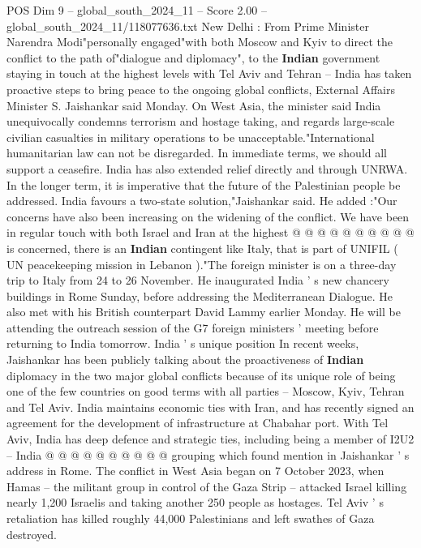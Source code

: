 \begin{textsample}{POS Dim 9 – global\_south\_2024\_11 – Score 2.00 – global\_south\_2024\_11/118077636.txt}  \label{ex:f9_pos_027}
New Delhi : From Prime Minister Narendra Modi"personally engaged"with both Moscow and Kyiv to direct the conflict to the path of"dialogue and diplomacy", to the \textbf{Indian} government staying in touch at the highest levels with Tel Aviv and Tehran -- India has taken proactive steps to bring peace to the ongoing global conflicts, External Affairs Minister S.
Jaishankar said Monday.
On West Asia, the minister said India unequivocally condemns terrorism and hostage taking, and regards large-scale civilian casualties in military operations to be unacceptable."International humanitarian law can not be disregarded.
In immediate terms, we should all support a ceasefire.
India has also extended relief directly and through UNRWA.
In the longer term, it is imperative that the future of the Palestinian people be addressed.
India favours a two-state solution,"Jaishankar said.
He added :"Our concerns have also been increasing on the widening of the conflict.
We have been in regular touch with both Israel and Iran at the highest @ @ @ @ @ @ @ @ @ @ is concerned, there is an \textbf{Indian} contingent like Italy, that is part of UNIFIL ( UN peacekeeping mission in Lebanon )."The foreign minister is on a three-day trip to Italy from 24 to 26 November.
He inaugurated India ' s new chancery buildings in Rome Sunday, before addressing the Mediterranean Dialogue.
He also met with his British counterpart David Lammy earlier Monday.
He will be attending the outreach session of the G7 foreign ministers ' meeting before returning to India tomorrow.
India ' s unique position In recent weeks, Jaishankar has been publicly talking about the proactiveness of \textbf{Indian} diplomacy in the two major global conflicts because of its unique role of being one of the few countries on good terms with all parties -- Moscow, Kyiv, Tehran and Tel Aviv.
India maintains economic ties with Iran, and has recently signed an agreement for the development of infrastructure at Chabahar port.
With Tel Aviv, India has deep defence and strategic ties, including being a member of I2U2 -- India @ @ @ @ @ @ @ @ @ @ grouping which found mention in Jaishankar ' s address in Rome.
The conflict in West Asia began on 7 October 2023, when Hamas -- the militant group in control of the Gaza Strip -- attacked Israel killing nearly 1,200 Israelis and taking another 250 people as hostages.
Tel Aviv ' s retaliation has killed roughly 44,000 Palestinians and left swathes of Gaza destroyed.

\end{textsample}
